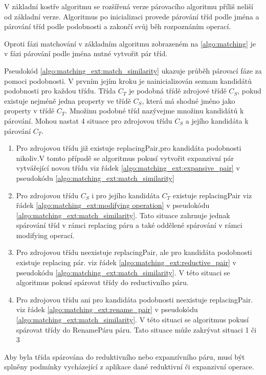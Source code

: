 \documentclass[11pt,twoside,a4paper]{book}
\begin{document}
V základní kostře algoritmu se rozšířená verze párovacího algoritmu příliš
neliší od základní verze.  Algoritmus po inicializaci provede párování tříd
podle jména a párování tříd podle podobnosti a zakončí svůj běh rozpoznáním
operací.

Oproti fázi matchování v základním algoritmu zobrazeném na \ref{algo:matching}
je v fázi párování podle jména nutné vytvořit pár tříd.

Pseudokód \ref{algo:matching_ext:match_similarity} ukazuje průběh párovací fáze
za pomoci podobnosti. V prvním jejím kroku je nainicializován seznam
kandidátů podobnosti pro každou třídu. Třída $C_T$ je podobná třídě zdrojové
třídě $C_S$, pokud existuje nejméně jedna property ve třídě $C_S$, která má
shodné jméno jako property v třídě $C_T$. Množinu podobné tříd nazývejme
množinu kandidátů k párování. Mohou nastat 4 situace pro zdrojovou třídu $C_S$ a
jejího kandidáta k párování $C_T$.

\begin{enumerate}
  \item Pro zdrojovou třídu již existuje replacingPair,pro kandidáta podobnosti
     nikoliv.V tomto případě se algoritmus pokusí vytvořit expanzivní pár
     vytvářející novou třídu viz řádek \ref{algo:matching_ext:expansive_pair}
     v pseudokódu \ref{algo:matching_ext:match_similarity}
  \item Pro zdrojovou třídu $C_S$ i pro jejího kandidáta $C_T$ existuje
     replacingPair viz řádek \ref{algo:matching_ext:modifying operation}
     v pseudokódu \ref{algo:matching_ext:match_similarity}. Tato situace
     zahrnuje jednak spárování tříd v rámci replacing páru a také oddělené
     spárování v rámci modifying operací.
  \item Pro zdrojovou třídu neexistuje replacingPair, ale pro kandidáta
     podobnosti existuje replacing pár. viz řádek
     \ref{algo:matching_ext:reductive_pair} v pseudokódu
     \ref{algo:matching_ext:match_similarity}. V této situaci se algoritmus
     pokusí spárovat třídy do reductivního páru. 
  \item Pro zdrojovou třídu ani pro kandidáta podobnosti neexistuje
     replacingPair. viz řádek \ref{algo:matching_ext:rename_pair} v
     pseudokódu \ref{algo:matching_ext:match_similarity}. V této situaci se algoritmus
     pokusí spárovat třídy do RenamePáru páru. Tato situace může zakrývat
     situaci 1 či 3
\end{enumerate}

Aby byla třída spárována do reduktivního nebo expanzívního páru, musí být
splněny podmínky vycházející z aplikace dané reduktivní či expanzivní operace.
\end{document}
